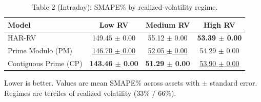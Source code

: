 \begin{table}[t]
\centering
\caption{Table 2 (Intraday): SMAPE\% by realized-volatility regime.}
\label{tab:regimes_intraday}
\begin{tabular}{lccc}
\toprule
Model & Low RV & Medium RV & High RV \\
\midrule
 HAR-RV & 149.45 $\pm$ 0.00 & 55.12 $\pm$ 0.00 & \textbf{53.39 $\pm$ 0.00} \\
 Prime Modulo (PM) & \underline{146.70 $\pm$ 0.00} & \underline{52.05 $\pm$ 0.00} & 54.29 $\pm$ 0.00 \\
 Contiguous Prime (CP) & \textbf{143.46 $\pm$ 0.00} & \textbf{51.29 $\pm$ 0.00} & \underline{53.90 $\pm$ 0.00} \\
\bottomrule
\end{tabular}
\vspace{2pt}\par\footnotesize Lower is better. Values are mean SMAPE\% across assets with $\pm$ standard error. Regimes are terciles of realized volatility (33\% / 66\%).
\end{table}